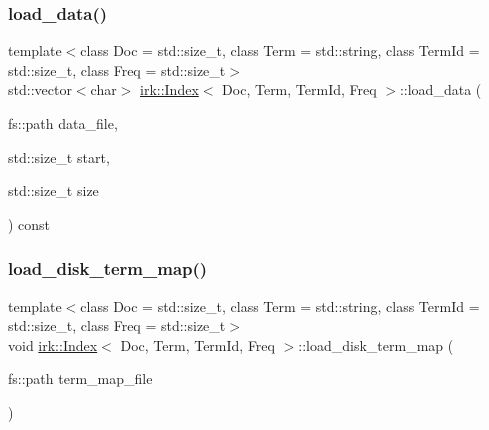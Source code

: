 \subsubsection{\texorpdfstring{load\+\_\+data()}{load\_data()}\hspace{0.1cm}{\footnotesize\ttfamily [2/2]}}
{\footnotesize\ttfamily template$<$class Doc  = std\+::size\+\_\+t, class Term  = std\+::string, class Term\+Id  = std\+::size\+\_\+t, class Freq  = std\+::size\+\_\+t$>$ \\
std\+::vector$<$char$>$ \mbox{\hyperlink{classirk_1_1Index}{irk\+::\+Index}}$<$ Doc, Term, Term\+Id, Freq $>$\+::load\+\_\+data (\begin{DoxyParamCaption}\item[{fs\+::path}]{data\+\_\+file,  }\item[{std\+::size\+\_\+t}]{start,  }\item[{std\+::size\+\_\+t}]{size }\end{DoxyParamCaption}) const\hspace{0.3cm}{\ttfamily [inline]}}

\mbox{\label{classirk_1_1Index_a20b301f9bb276d04a86f2c8c72ade2ae}} 
\subsubsection{\texorpdfstring{load\+\_\+disk\+\_\+term\+\_\+map()}{load\_disk\_term\_map()}}
{\footnotesize\ttfamily template$<$class Doc  = std\+::size\+\_\+t, class Term  = std\+::string, class Term\+Id  = std\+::size\+\_\+t, class Freq  = std\+::size\+\_\+t$>$ \\
void \mbox{\hyperlink{classirk_1_1Index}{irk\+::\+Index}}$<$ Doc, Term, Term\+Id, Freq $>$\+::load\+\_\+disk\+\_\+term\+\_\+map (\begin{DoxyParamCaption}\item[{fs\+::path}]{term\+\_\+map\+\_\+file }\end{DoxyParamCaption})\hspace{0.3cm}{\ttfamily [inline]}}

\mbox{\label{classirk_1_1Index_a4d6432c69c4b40878eb37d3a4d9d7498}} 
